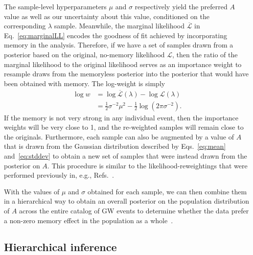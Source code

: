 \documentclass[aps,prd,reprint,twocolumn,10pt,eqsecnum,showpacs,nofootinbib,amsfonts,amssymb,amsmath,longbibliography,superscriptaddress,floatfix]{revtex4-1}
\begin{document}
The sample-level hyperparameters $\mu$ and $\sigma$ respectively yield the preferred $A$ value as well as our uncertainty about this value, conditioned on the corresponding $\lambda$ sample. Meanwhile, the marginal likelihood $\overline{\mathcal{L}}$ in Eq.~\eqref{eq:marginalLL} encodes the goodness of fit achieved by incorporating memory in the analysis. Therefore, if we have a set of samples drawn from a posterior based on the original, no-memory likelihood $\mathcal{L}$, then the ratio of the marginal likelihood to the original likelihood serves as an importance weight to resample draws from the memoryless posterior into the posterior that would have been obtained with memory.
The log-weight is simply
\begin{align}
	\label{eq:weight}
	\log w&=\log\overline{\mathcal{L}}(\lambda)-\log\mathcal{L}(\lambda)\nonumber\\&=\frac{1}{2}\sigma^{-2}\mu^{2}-\frac{1}{2}\log\left(2\pi\sigma^{-2}\right).
\end{align}
If the memory is not very strong in any individual event, then the importance weights will be very close to 1, and the re-weighted samples will remain close to the originals. Furthermore, each sample can also be augmented by a value of $A$ that is drawn from the Gaussian distribution described by Eqs.~\eqref{eq:mean} and~\eqref{eq:stddev} to obtain a new set of samples that were instead drawn from the posterior on $A$. This procedure is similar to the likelihood-reweightings that were performed previously in, e.g., Refs.~\cite{Romero-Shaw:2019itr,Payne:2019wmy}.


With the values of $\mu$ and $\sigma$ obtained for each sample, we can then combine them in a hierarchical way to obtain an overall posterior on the population distribution of $A$ across the entire catalog of GW events to determine whether the data prefer a non-zero memory effect in the population as a whole~\cite{Isi:2022cii}.

\subsection{Hierarchical inference}
\label{sec:hierarchicalinference}
\end{document}
